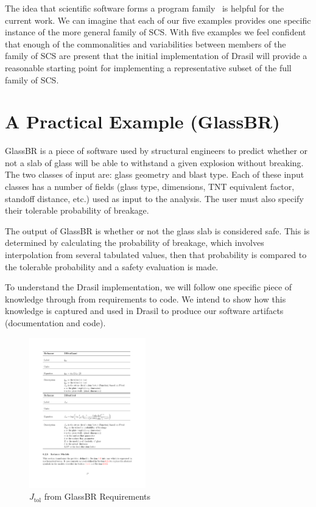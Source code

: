 \documentclass[sigconf]{acmart}
\newcommand{\jtol}{$J_{\mbox{tol}}$}
\begin{document}
The idea that scientific software forms a program
family~\cite{SmithMcCutchanAndCao2007} is helpful for the current work.  We can
imagine that each of our five examples provides one specific instance of the
more general family of SCS.  With five examples we feel confident that enough of
the commonalities and variabilities between members of the family of SCS are
present that the initial implementation of Drasil will provide a reasonable
starting point for implementing a representative subset of the full family of
SCS.

\section{A Practical Example (GlassBR)} \label{SecGlassBR}

GlassBR is a piece of software used by structural engineers to predict whether or 
not a slab of glass will be able to withstand a given explosion without
breaking.  The two classes of input are: glass geometry and blast type. Each of these input 
classes has a number of fields (glass type, dimensions, TNT equivalent factor, 
standoff distance, etc.) used as input to the analysis. The user must also 
specify their tolerable probability of breakage.

The output of GlassBR is whether or not the glass slab is considered safe.  This
is determined by calculating the probability of breakage, which involves
interpolation from several tabulated values, then that probability is compared
to the tolerable probability and a safety evaluation is made.

To understand the Drasil implementation, we will follow one specific piece of 
knowledge through from requirements to code. We intend to show how this 
knowledge is captured and used in Drasil to produce our software artifacts 
(documentation and code).


\begin{figure}
\begin{center}
\includegraphics[width=0.45\textwidth]{./figures/Jtol_pdf.pdf}
\end{center}
\caption{\jtol{} from GlassBR Requirements}
\label{Fig_Jtolpdf}
\end{figure}
\end{document}
